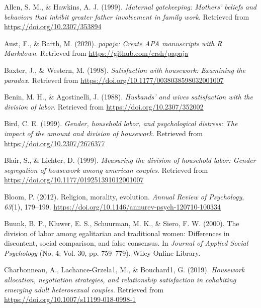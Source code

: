 \documentclass[
  man,floatsintext]{apa6}
\newlength{\cslhangindent}
\newlength{\cslentryspacingunit} %
\newenvironment{CSLReferences}[2] %
 {%
  \setlength{\parindent}{0pt}
  \ifodd #1
  \let\oldpar\par
  \def\par{\hangindent=\cslhangindent\oldpar}
  \fi
  \setlength{\parskip}{#2\cslentryspacingunit}
 }%
 {}
\begin{document}
\hypertarget{refs}{}
\begin{CSLReferences}{1}{0}
\leavevmode{}%
Allen, S. M., \& Hawkins, A. J. (1999). \emph{Maternal gatekeeping: Mothers' beliefs and behaviors that inhibit greater father involvement in family work}. Retrieved from \url{https://doi.org/10.2307/353894}

\leavevmode{}%
Aust, F., \& Barth, M. (2020). \emph{{papaja}: {Create} {APA} manuscripts with {R Markdown}}. Retrieved from \url{https://github.com/crsh/papaja}

\leavevmode{}%
Baxter, J., \& Western, M. (1998). \emph{Satisfaction with housework: Examining the paradox.} Retrieved from \url{https://doi.org/10.1177/0038038598032001007}

\leavevmode{}%
Benin, M. H., \& Agostinelli, J. (1988). \emph{Husbands' and wives satisfaction with the division of labor}. Retrieved from \url{https://doi.org/10.2307/352002}

\leavevmode{}%
Bird, C. E. (1999). \emph{Gender, household labor, and psychological distress: The impact of the amount and division of housework}. Retrieved from \url{https://doi.org/10.2307/2676377}

\leavevmode{}%
Blair, S., \& Lichter, D. (1999). \emph{Measuring the division of household labor: Gender segregation of housework among american couples}. Retrieved from \url{https://doi.org/10.1177/019251391012001007}

\leavevmode{}%
Bloom, P. (2012). Religion, morality, evolution. \emph{Annual Review of Psychology}, \emph{63}(1), 179--199. \url{https://doi.org/10.1146/annurev-psych-120710-100334}

\leavevmode{}%
Buunk, B. P., Kluwer, E. S., Schuurman, M. K., \& Siero, F. W. (2000). The division of labor among egalitarian and traditional women: Differences in discontent, social comparison, and false consensus. In \emph{Journal of Applied Social Psychology} (No. 4; Vol. 30, pp. 759--779). Wiley Online Library.

\leavevmode{}%
Charbonneau, A., Lachance-Grzela1, M., \& Bouchard1, G. (2019). \emph{Housework allocation, negotiation strategies, and relationship satisfaction in cohabiting emerging adult heterosexual couples}. Retrieved from \url{https://doi.org/10.1007/s11199-018-0998-1}


\end{CSLReferences}
\end{document}
